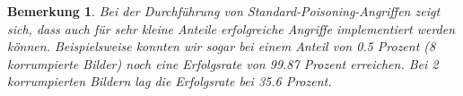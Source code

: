 \documentclass[11pt,a4paper]{article}
\newtheorem{remark}[theorem]{Bemerkung}
\numberwithin{equation}{section}
\begin{document}

	\begin{remark}
		Bei der Durchführung von Standard-Poisoning-Angriffen zeigt sich, dass auch für sehr kleine Anteile erfolgreiche Angriffe implementiert werden können. Beispielsweise konnten wir sogar bei einem Anteil von 0.5 Prozent (8 korrumpierte Bilder) noch eine Erfolgsrate von 99.87 Prozent erreichen. Bei 2 korrumpierten Bildern lag die Erfolgsrate bei 35.6 Prozent.
	\end{remark}
	
\end{document}

